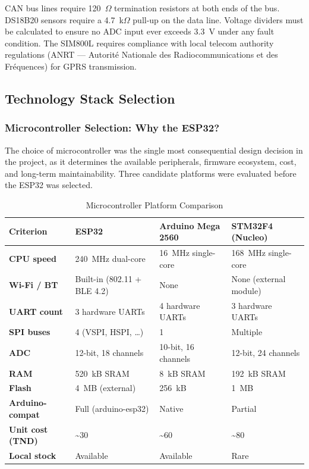 CAN bus lines require 120~$\Omega$ termination resistors at both ends of the bus. DS18B20 sensors require a 4.7~k$\Omega$ pull-up on the data line. Voltage dividers must be calculated to ensure no ADC input ever exceeds 3.3~V under any fault condition. The SIM800L requires compliance with local telecom authority regulations (ANRT --- Autorité Nationale des Radiocommunications et des Fréquences) for GPRS transmission.

\subsection{Technology Stack Selection}

\subsubsection*{Microcontroller Selection: Why the ESP32?}

The choice of microcontroller was the single most consequential design decision in the project, as it determines the available peripherals, firmware ecosystem, cost, and long-term maintainability. Three candidate platforms were evaluated before the ESP32 was selected.

\begin{table}[H]
\centering
\caption{Microcontroller Platform Comparison}
\label{tab:mcu-comparison}
\small
\begin{tabular}{>{\bfseries}p{2.8cm} p{2.8cm} p{2.8cm} p{2.8cm}}
\toprule
Criterion & ESP32 & Arduino Mega 2560 & STM32F4 (Nucleo) \\
\midrule
CPU speed      & 240~MHz dual-core & 16~MHz single-core & 168~MHz single-core \\
Wi-Fi / BT     & Built-in (802.11 + BLE 4.2) & None & None (external module) \\
UART count     & 3 hardware UARTs & 4 hardware UARTs & 3 hardware UARTs \\
SPI buses      & 4 (VSPI, HSPI, …) & 1 & Multiple \\
ADC            & 12-bit, 18 channels & 10-bit, 16 channels & 12-bit, 24 channels \\
RAM            & 520~kB SRAM & 8~kB SRAM & 192~kB SRAM \\
Flash          & 4~MB (external) & 256~kB & 1~MB \\
Arduino-compat & Full (arduino-esp32) & Native & Partial \\
Unit cost (TND)& \textasciitilde30 & \textasciitilde60 & \textasciitilde80 \\
Local stock    & Available & Available & Rare \\
\bottomrule
\end{tabular}
\end{table}

